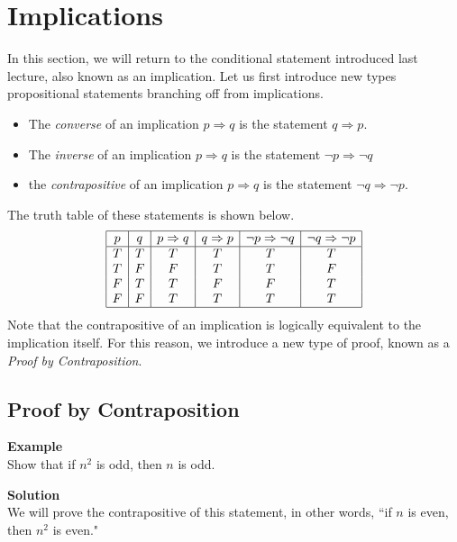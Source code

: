 \documentclass{article}
\begin{document}
\section*{Implications}
    In this section, we will return to the conditional statement introduced last lecture, also known as an implication. Let us first introduce new types propositional statements branching off from implications.
    \begin{itemize}[itemsep = 0.2mm, parsep = 5pt, topsep = 5pt]
        \item The \textit{converse} of an implication $p \Rightarrow q$ is the statement $q \Rightarrow p$.
        \item The \textit{inverse} of an implication $p \Rightarrow q$ is the statement $\neg p \Rightarrow \neg q$
        \item the \textit{contrapositive} of an implication $p \Rightarrow q$ is the statement $\neg q \Rightarrow \neg p$.
    \end{itemize}
    The truth table of these statements is shown below.
    $$\begin{array}{|c|c|c|c|c|c|}
        \hline
        p & q & p \Rightarrow q & q \Rightarrow p & \neg p \Rightarrow \neg q & \neg q \Rightarrow \neg p\\
        \hline
        T & T & T & T & T & T\\
        T & F & F & T & T & F \\
        F & T & T & F & F & T \\
        F & F & T & T & T & T \\
        \hline
    \end{array}$$
    Note that the contrapositive of an implication is logically equivalent to the implication itself. For this reason, we introduce a new type of proof, known as a \textit{Proof by Contraposition}.
    
    \subsection*{Proof by Contraposition}
    
    \vspace{1.5mm}
    \textbf{Example} \\
    Show that if $n^2$ is odd, then $n$ is odd.
    
    \vspace{1.5mm}
    \textbf{Solution} \\
    We will prove the contrapositive of this statement, in other words, ``if $n$ is even, then $n^{2}$ is even."
    
\end{document}
